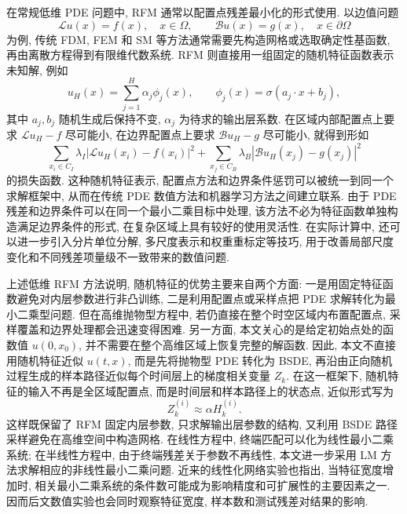     在常规低维 PDE 问题中, RFM 通常以配置点残差最小化的形式使用.
    以边值问题
    \begin{equation*}
      \mathcal{L}u(x)=f(x),\quad x\in\Omega,\qquad
      \mathcal{B}u(x)=g(x),\quad x\in\partial\Omega
    \end{equation*}
    为例, 传统 FDM, FEM 和 SM 等方法通常需要先构造网格或选取确定性基函数,
    再由离散方程得到有限维代数系统.
    RFM 则直接用一组固定的随机特征函数表示未知解,
    例如
    \begin{equation*}
      u_H(x) = \sum_{j=1}^{H} \alpha_j \phi_j(x),
      \qquad
      \phi_j(x)=\sigma(a_j\cdot x+b_j),
    \end{equation*}
    其中 $a_j,b_j$ 随机生成后保持不变, $\alpha_j$ 为待求的输出层系数.
    在区域内部配置点上要求 $\mathcal{L}u_H-f$ 尽可能小,
    在边界配置点上要求 $\mathcal{B}u_H-g$ 尽可能小,
    就得到形如
    \begin{equation*}
      \sum_{x_i\in C_I}
      \lambda_I\left|\mathcal{L}u_H(x_i)-f(x_i)\right|^2
      +
      \sum_{x_j\in C_B}
      \lambda_B\left|\mathcal{B}u_H(x_j)-g(x_j)\right|^2
    \end{equation*}
    的损失函数.
    这种随机特征表示, 配置点方法和边界条件惩罚可以被统一到同一个求解框架中,
    从而在传统 PDE 数值方法和机器学习方法之间建立联系\cite{chenBridgingTraditionalMachine2022}.
    由于 PDE 残差和边界条件可以在同一个最小二乘目标中处理,
    该方法不必为特征函数单独构造满足边界条件的形式,
    在复杂区域上具有较好的使用灵活性.
    在实际计算中, 还可以进一步引入分片单位分解, 多尺度表示和权重重标定等技巧,
    用于改善局部尺度变化和不同残差项量级不一致带来的数值问题\cite{chenBridgingTraditionalMachine2022}.

    上述低维 RFM 方法说明, 随机特征的优势主要来自两个方面:
    一是用固定特征函数避免对内层参数进行非凸训练,
    二是利用配置点或采样点把 PDE 求解转化为最小二乘型问题.
    但在高维抛物型方程中, 若仍直接在整个时空区域内布置配置点,
    采样覆盖和边界处理都会迅速变得困难.
    另一方面, 本文关心的是给定初始点处的函数值 $u(0,x_0)$,
    并不需要在整个高维区域上恢复完整的解函数.
    因此, 本文不直接用随机特征近似 $u(t,x)$,
    而是先将抛物型 PDE 转化为 BSDE,
    再沿由正向随机过程生成的样本路径近似每个时间层上的梯度相关变量 $Z_k$.
    在这一框架下, 随机特征的输入不再是全区域配置点,
    而是时间层和样本路径上的状态点,
    近似形式写为
    \begin{equation*}
      Z_k^{(i)} \approx \alpha H_k^{(i)}.
    \end{equation*}
    这样既保留了 RFM 固定内层参数, 只求解输出层参数的结构,
    又利用 BSDE 路径采样避免在高维空间中构造网格.
    在线性方程中, 终端匹配可以化为线性最小二乘系统;
    在半线性方程中, 由于终端残差关于参数不再线性,
    本文进一步采用 LM 方法求解相应的非线性最小二乘问题.
    近来的线性化网络实验也指出, 当特征宽度增加时,
    相关最小二乘系统的条件数可能成为影响精度和可扩展性的主要因素之一.
    因而后文数值实验也会同时观察特征宽度, 样本数和测试残差对结果的影响\cite{maoSolvingHighDimensionalPDEs2026}.

